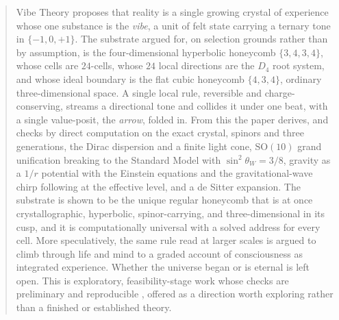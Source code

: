 \begin{abstract}
Vibe Theory proposes that reality is a single growing crystal of experience whose one substance is the
\emph{vibe}, a unit of felt state carrying a ternary tone in $\{-1, 0, +1\}$. The substrate argued for, on
selection grounds rather than by assumption, is the four-dimensional hyperbolic honeycomb $\{3,4,3,4\}$, whose
cells are $24$-cells, whose $24$ local directions are the $D_4$ root system, and whose ideal boundary is the flat
cubic honeycomb $\{4,3,4\}$, ordinary three-dimensional space. A single local rule, reversible and
charge-conserving, streams a directional tone and collides it under one beat, with a single value-posit, the
\emph{arrow}, folded in. From this the paper derives, and checks by direct computation on the exact crystal,
spinors and three generations, the Dirac dispersion and a finite light cone, $\mathrm{SO}(10)$ grand unification
breaking to the Standard Model with $\sin^2\theta_W = 3/8$, gravity as a $1/r$ potential with the Einstein
equations and the gravitational-wave chirp following at the effective level, and a de Sitter expansion. The
substrate is shown to be the unique regular honeycomb that is at once crystallographic, hyperbolic,
spinor-carrying, and three-dimensional in its cusp, and it is computationally universal with a solved address for
every cell. More speculatively, the same rule read at larger scales is argued to climb through life and mind to a
graded account of consciousness as integrated experience. Whether the universe began or is eternal is left open.
This is exploratory, feasibility-stage work whose checks are preliminary and reproducible \cite{pollard2026vibetest},
offered as a direction worth exploring rather than a finished or established theory.
\end{abstract}
